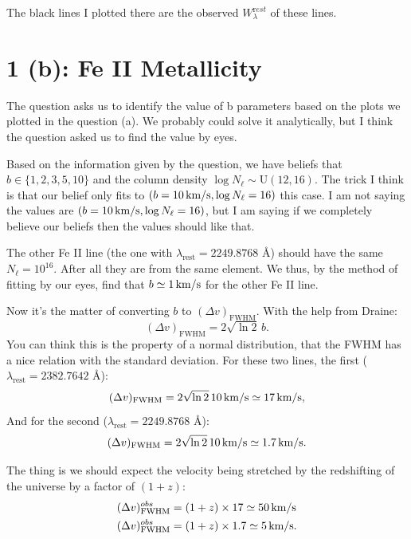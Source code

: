 \documentclass[12pt,letterpaper]{article}
\newcommand{\mt}{\mathrm}
\newcommand{\uniform}{\textrm{U}}
\newcommand{\EWrest}{W^{\mt rest}_\lambda}
\newcommand{\lambdarest}{\lambda_{\textrm{rest}}}
\newcommand{\columndensity}{N_\ell}
\newcommand{\kms}{\textrm{\,km/s}}
\newcommand{\dvfwhm}{(\Delta v)_{\textrm{FWHM}}}
\begin{document}
The black lines I plotted there are the observed $\EWrest$ of these lines.

\section*{1 (b): Fe II Metallicity}
The question asks us to identify the value of b parameters based on the plots we plotted in the question (a).
We probably could solve it analytically, but I think the question asked us to find the value by eyes.

Based on the information given by the question, we have beliefs that $b \in \{ 1, 2, 3, 5, 10\}$ and the column density $\log\columndensity \sim \uniform(12, 16)$.
The trick I think is that our belief only fits to $(b=10\kms, \log{N_\ell} = 16)$ this case.
I am not saying the values are $(b=10\kms, \log{N_\ell} = 16)$, but I am saying if we completely believe our beliefs then the values should like that.

The other Fe II line (the one with $\lambdarest = 2249.8768$ \AA) should have the same $\columndensity = 10^{16}$.
After all they are from the same element.
We thus, by the method of fitting by our eyes, find that $b \simeq 1 \kms $ for the other Fe II line.

Now it's the matter of converting $b$ to $\dvfwhm$.
With the help from Draine:
\begin{equation}
    \dvfwhm = 2 \sqrt{\ln{2}}\, b.
\end{equation}
You can think this is the property of a normal distribution, that the FWHM has a nice relation with the standard deviation.
For these two lines, the first ($\lambdarest = 2382.7642$ \AA):
\begin{equation*}
    \dvfwhm = 2 \sqrt{\ln 2} \, 10 \kms \simeq 17\kms,
\end{equation*}
And for the second ($\lambdarest = 2249.8768$ \AA):
\begin{equation*}
    \dvfwhm = 2 \sqrt{\ln 2} \, 10 \kms \simeq 1.7\kms.    
\end{equation*}

The thing is we should expect the velocity being stretched by the redshifting of the universe by a factor of $(1 + z)$:
\begin{equation}
    \begin{split}
        \dvfwhm^{obs}  &= (1+z) \times 17 \simeq 50 \kms\\
        \dvfwhm^{obs}  &= (1+z) \times 1.7 \simeq 5 \kms.
    \end{split}
\end{equation}
\end{document}
